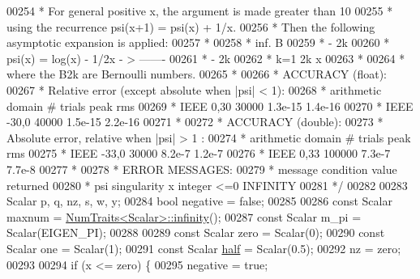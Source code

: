 \begin{DoxyCode}
00254 \textcolor{comment}{     * For general positive x, the argument is made greater than 10}
00255 \textcolor{comment}{     * using the recurrence  psi(x+1) = psi(x) + 1/x.}
00256 \textcolor{comment}{     * Then the following asymptotic expansion is applied:}
00257 \textcolor{comment}{     *}
00258 \textcolor{comment}{     *                           inf.   B}
00259 \textcolor{comment}{     *                            -      2k}
00260 \textcolor{comment}{     * psi(x) = log(x) - 1/2x -   >   -------}
00261 \textcolor{comment}{     *                            -        2k}
00262 \textcolor{comment}{     *                           k=1   2k x}
00263 \textcolor{comment}{     *}
00264 \textcolor{comment}{     * where the B2k are Bernoulli numbers.}
00265 \textcolor{comment}{     *}
00266 \textcolor{comment}{     * ACCURACY (float):}
00267 \textcolor{comment}{     *    Relative error (except absolute when |psi| < 1):}
00268 \textcolor{comment}{     * arithmetic   domain     # trials      peak         rms}
00269 \textcolor{comment}{     *    IEEE      0,30        30000       1.3e-15     1.4e-16}
00270 \textcolor{comment}{     *    IEEE      -30,0       40000       1.5e-15     2.2e-16}
00271 \textcolor{comment}{     *}
00272 \textcolor{comment}{     * ACCURACY (double):}
00273 \textcolor{comment}{     *    Absolute error,  relative when |psi| > 1 :}
00274 \textcolor{comment}{     * arithmetic   domain     # trials      peak         rms}
00275 \textcolor{comment}{     *    IEEE      -33,0        30000      8.2e-7      1.2e-7}
00276 \textcolor{comment}{     *    IEEE      0,33        100000      7.3e-7      7.7e-8}
00277 \textcolor{comment}{     *}
00278 \textcolor{comment}{     * ERROR MESSAGES:}
00279 \textcolor{comment}{     *     message         condition      value returned}
00280 \textcolor{comment}{     * psi singularity    x integer <=0      INFINITY}
00281 \textcolor{comment}{     */}
00282 
00283     Scalar p, q, nz, s, w, y;
00284     \textcolor{keywordtype}{bool} negative = \textcolor{keyword}{false};
00285 
00286     \textcolor{keyword}{const} Scalar maxnum = \hyperlink{group___core___module_struct_eigen_1_1_num_traits}{NumTraits<Scalar>::infinity}();
00287     \textcolor{keyword}{const} Scalar m\_pi = Scalar(EIGEN\_PI);
00288 
00289     \textcolor{keyword}{const} Scalar zero = Scalar(0);
00290     \textcolor{keyword}{const} Scalar one = Scalar(1);
00291     \textcolor{keyword}{const} Scalar \hyperlink{struct_eigen_1_1half}{half} = Scalar(0.5);
00292     nz = zero;
00293 
00294     \textcolor{keywordflow}{if} (x <= zero) \{
00295       negative = \textcolor{keyword}{true};

\end{DoxyCode}
